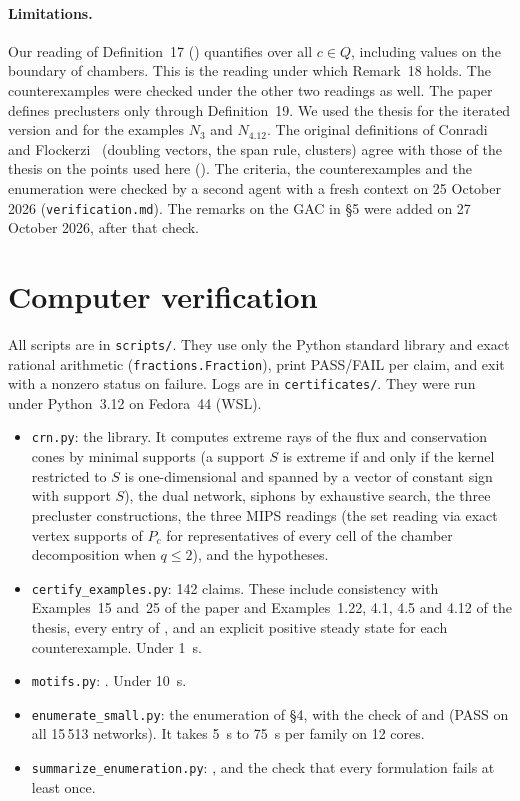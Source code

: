 \documentclass[11pt,a4paper]{report}
\begin{document}
\paragraph{Limitations.} Our reading of Definition~17 () quantifies over all \(c\in Q\), including
values on the boundary of chambers. This is the reading under which Remark~18 holds. The counterexamples were checked
under the other two readings as well. The paper defines preclusters only through Definition~19. We used the thesis
for the iterated version and for the examples \(N_3\) and \(N_{4.12}\). The original definitions of Conradi and
Flockerzi~\autocite{ConradiFlockerzi2012} (doubling vectors, the span rule, clusters) agree with those of the thesis
on the points used here (). The criteria, the counterexamples and the enumeration were checked by
a second agent with a fresh context on 25 October 2026 (\texttt{verification.md}). The remarks on the GAC in §5 were
added on 27 October 2026, after that check.

\section{Computer verification}

All scripts are in \texttt{scripts/}. They use only the Python standard library and exact rational arithmetic
(\texttt{fractions.Fraction}), print PASS/FAIL per claim, and exit with a nonzero status on failure. Logs are in
\texttt{certificates/}. They were run under Python~3.12 on Fedora~44 (WSL).
\begin{itemize}
\item \texttt{crn.py}: the library. It computes extreme rays of the flux and conservation cones by minimal supports
(a support \(S\) is extreme if and only if the kernel restricted to \(S\) is one-dimensional and spanned by a vector of
constant sign with support \(S\)), the dual network, siphons by exhaustive search, the three precluster constructions,
the three MIPS readings (the set reading via exact vertex supports of \(P_c\) for representatives of every cell of the
chamber decomposition when \(q\le2\)), and the hypotheses.
\item \texttt{certify\_examples.py}: 142 claims. These include consistency with Examples~15 and~25 of the paper and
Examples~1.22, 4.1, 4.5 and 4.12 of the thesis, every entry of , and an explicit positive
steady state for each counterexample. Under 1~s.
\item \texttt{motifs.py}: . Under 10~s.
\item \texttt{enumerate\_small.py}: the enumeration of §4, with the check of  and
 (PASS on all 15\,513 networks). It takes 5~s to 75~s per family on 12 cores.
\item \texttt{summarize\_enumeration.py}: , and the check that every formulation fails at least once.
\end{itemize}

\paperreferences
\end{document}
